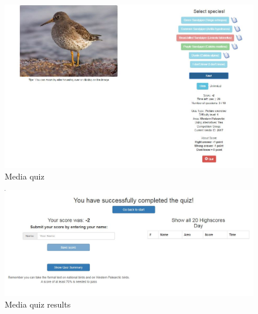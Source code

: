 \begin{figure}[h]
  \centering
  \includegraphics[width=1.0\textwidth]{figures/Quiz.JPG}
  \caption[MediaQuiz]{Media quiz}
  \label{fig:MediaQuiz}
\end{figure}




\begin{figure}[h]
  \centering
  \includegraphics[width=1.0\textwidth]{figures/MediaQuizResults.JPG}
  \caption[MediaQuizResults]{Media quiz results}
  \label{fig:MediaQuizResults}
\end{figure}




